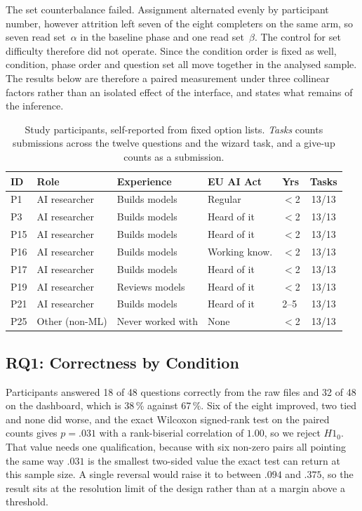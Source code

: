 \documentclass[10pt,conference]{IEEEtran}
\newcommand{\tblsetup}{%
  \footnotesize%
  \setlength{\tabcolsep}{3pt}%
  \renewcommand{\arraystretch}{1.02}%
}
\begin{document}
The set counterbalance failed.
Assignment alternated evenly by participant number, however attrition left seven of the eight completers on the same arm, so seven read set~$\alpha$ in the baseline phase and one read set~$\beta$.
The control for set difficulty therefore did not operate.
Since the condition order is fixed as well, condition, phase order and question set all move together in the analysed sample.
The results below are therefore a paired measurement under three collinear factors rather than an isolated effect of the interface, and  states what remains of the inference.

\begin{table}[t]
  \caption{Study participants, self-reported from fixed option lists. \emph{Tasks} counts submissions across the twelve questions and the wizard task, and a give-up counts as a submission.}
  \label{tab:participants}
  \centering
  \tblsetup
  \begin{tabularx}{\columnwidth}{@{}l X l l l c@{}}
    \toprule
    ID & Role & Experience & EU AI Act & Yrs & Tasks \\
    \midrule
    P1 & AI researcher & Builds models & Regular & $<$2 & 13/13 \\
    P3 & AI researcher & Builds models & Heard of it & $<$2 & 13/13 \\
    P15 & AI researcher & Builds models & Heard of it & $<$2 & 13/13 \\
    P16 & AI researcher & Builds models & Working know. & $<$2 & 13/13 \\
    P17 & AI researcher & Builds models & Heard of it & $<$2 & 13/13 \\
    P19 & AI researcher & Reviews models & Heard of it & $<$2 & 13/13 \\
    P21 & AI researcher & Builds models & Heard of it & 2--5 & 13/13 \\
    P25 & Other (non-ML) & Never worked with & None & $<$2 & 13/13 \\
    \bottomrule
  \end{tabularx}
\end{table}

\subsection{RQ1: Correctness by Condition}
Participants answered 18 of 48 questions correctly from the raw files and 32 of 48 on the dashboard, which is 38\,\% against 67\,\%.
Six of the eight improved, two tied and none did worse, and the exact Wilcoxon signed-rank test on the paired counts gives $p = .031$ with a rank-biserial correlation of $1.00$, so we reject $H1_0$.
That value needs one qualification, because with six non-zero pairs all pointing the same way $.031$ is the smallest two-sided value the exact test can return at this sample size.
A single reversal would raise it to between $.094$ and $.375$, so the result sits at the resolution limit of the design rather than at a margin above a threshold.
\end{document}
